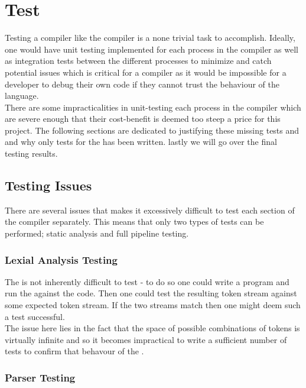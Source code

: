 \section{Test}
\label{sec:Test}

Testing a compiler like the \lang{} compiler is a none trivial task to
accomplish. Ideally, one would have unit testing implemented for each process in the
compiler as well as integration tests between the different processes
to minimize and catch potential issues which is critical for a compiler as it would
be impossible for a developer to debug their own code if they cannot trust the
behaviour of the language. \\

There are some impracticalities in unit-testing each process in the \lang{} compiler
which are severe enough that their cost-benefit is deemed too steep a price for this
project. The following sections are dedicated to justifying these missing tests and
and why only tests for the \borrowChecker{} has been written.
lastly we will go over the final testing results.

\subsection{Testing Issues}

There are several issues that makes it excessively difficult to test each section of
the \lang{} compiler separately. This means that only two types of tests can be
performed; static analysis and full pipeline testing. 

\subsubsection{Lexial Analysis Testing}

The \lexer{} is not inherently difficult to test - to do so one could write a program
and run the \lexer{} against the code. Then one could test the resulting token stream
against some expected token stream. If the two streams match then one might deem
such a test successful. \\

The issue here lies in the fact that the space of possible combinations of tokens is virtually
infinite and so it becomes impractical to write a sufficient number of tests to
confirm that behavour of the \lexer{}.

\subsubsection{Parser Testing}

